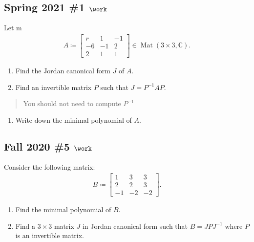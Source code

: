 \hypertarget{spring-2021-1-work}{%
\subsection{\texorpdfstring{Spring 2021 \#1
\(\work\)}{Spring 2021 \#1 \textbackslash work}}\label{spring-2021-1-work}}

Let m
\begin{align*}
A \coloneqq
\begin{bmatrix}
r & 1 & -1 \\
-6 & -1 & 2 \\
2 & 1 & 1
\end{bmatrix}
\in \operatorname{Mat}(3\times 3, {\mathbb{C}})
.\end{align*}

\begin{enumerate}
\def\labelenumi{\alph{enumi}.}
\item
  Find the Jordan canonical form \(J\) of \(A\).
\item
  Find an invertible matrix \(P\) such that \(J = P ^{-1}A P\).
\end{enumerate}

\begin{quote}
You should not need to compute \(P^{-1}\)
\end{quote}

\begin{enumerate}
\def\labelenumi{\alph{enumi}.}
\setcounter{enumi}{2}
\tightlist
\item
  Write down the minimal polynomial of \(A\).
\end{enumerate}

\hypertarget{fall-2020-5-work}{%
\subsection{\texorpdfstring{Fall 2020 \#5
\(\work\)}{Fall 2020 \#5 \textbackslash work}}\label{fall-2020-5-work}}

Consider the following matrix:
\begin{align*}
B \coloneqq
\begin{bmatrix}
1 & 3 & 3
\\
2 & 2 & 3
\\
-1 & -2 & -2
\end{bmatrix}
.\end{align*}

\begin{enumerate}
\def\labelenumi{\alph{enumi}.}
\item
  Find the minimal polynomial of \(B\).
\item
  Find a \(3\times 3\) matrix \(J\) in Jordan canonical form such that
  \(B = JPJ^{-1}\) where \(P\) is an invertible matrix.
\end{enumerate}


\printbibliography[title=Bibliography]



